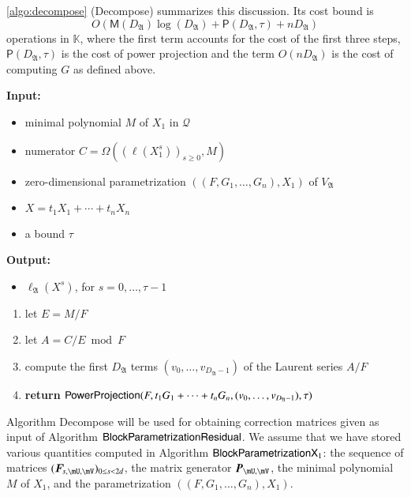 \documentclass[final,1p,times,authoryear]{elsarticle}
\newcommand{\mat}[1]{\bm{\MakeUppercase{#1}}} %
\newcommand{\seqelt}[1]{\bm{F}_{#1}} %
\newcommand{\mainalgoname}{\mathsf{ BlockParametrization}}
\newcommand{\lf}{X}
\newcommand{\residueI}{\mathscr{Q}}
\def\M {\ensuremath{\mathsf{M}}}
\def\PP {\ensuremath{\mathsf{P}}}
\def\K{\mathbb{K}}
\def\K {\ensuremath{\mathbb{K}}}
\begin{document}
\cref{algo:decompose} (\textsf{Decompose}) summarizes this discussion. Its cost
bound is
\[
  O(\M(D_\mathfrak{A})\log(D_\mathfrak{A}) + \PP(D_\mathfrak{A},\tau) +nD_\mathfrak{A})
\]
operations in $\K$, where the first term accounts for the cost of the first
three steps, $\PP(D_\mathfrak{A},\tau)$ is the cost of power projection and the
term $O(nD_\mathfrak{A})$ is the cost of computing $G$ as defined above.

\begin{algorithm}[ht]
  \caption{${\sf Decompose}(M, C, ((F,G_1,\dots,G_n),X_1), \lf,\tau)$} {\bf
  Input:} \vspace{-0.5em}
  \begin{itemize}
    \item minimal polynomial $M$ of $X_1$ in $\residueI$
    \item numerator $C=\Omega( (\ell(X_1^s))_{s \ge 0}, M)$
    \item zero-dimensional parametrization $((F,G_1,\dots,G_n),X_1)$ of $V_\mathfrak{A}$
    \item $\lf =t_1 X_1 + \cdots + t_n X_n$
    \item a bound $\tau$
  \end{itemize}
  {\bf Output:}  \vspace{-0.5em}
  \begin{itemize}
    \item $\ell_\mathfrak{A}(\lf^s)$, for $s=0,\dots,\tau-1$
  \end{itemize}
  \begin{enumerate}
    \item let $E=M/F$
    \item let $A=C/E \bmod F$
    \item compute the first $D_\mathfrak{A}$ terms $(v_0,\dots,v_{D_\mathfrak{A}-1})$ of the Laurent series $A/F$
    \item {\bf return} ${\sf PowerProjection}(F, t_1 G_1 + \cdots + t_n G_n, (v_0,\dots,v_{D_\mathfrak{A}-1}),\tau)$
  \end{enumerate}
  \label{algo:decompose}
\end{algorithm}

Algorithm \textsf{Decompose} will be used for obtaining correction matrices
given as input of Algorithm $\mainalgoname{\sf Residual}$. We assume that we
have stored various quantities computed in Algorithm $\mainalgoname{\sf X}_1$:
the sequence of matrices $(\seqelt{s,\mU,\mV})_{0 \le s < 2d}$, the matrix
generator $\mat{P}_{\mU,\mV}$, the minimal polynomial $M$ of $X_1$, and the
parametrization $((F,G_1,\dots,G_n),X_1)$.
\end{document}
